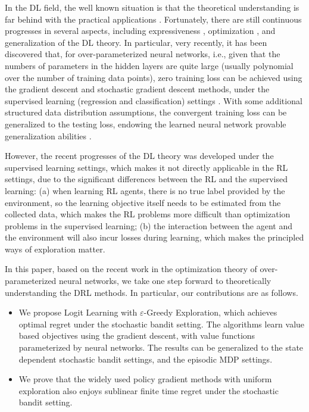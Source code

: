 In the DL field, the well known situation is that the theoretical understanding is far behind with the practical applications \citep{goodfellow2016deep,zhang2016understanding}. Fortunately, there are still continuous progresses in several aspects, including expressiveness \citep{cybenko1989approximation,raghu2017expressive}, optimization \citep{kawaguchi2016deep,li2017convergence,li2018learning,du2018gradientA,du2018gradientB,allen2018convergenceA,allen2018convergenceB}, and generalization \cite{neyshabur2017exploring,allen2018learning} of the DL theory. In particular, very recently, it has been discovered that, for over-parameterized neural networks, i.e., given that the numbers of parameters in the hidden layers are quite large (usually polynomial over the number of training data points), zero training loss can be achieved using the gradient descent and stochastic gradient descent methods, under the supervised learning (regression and classification) settings \citep{li2018learning,du2018gradientA,du2018gradientB,allen2018convergenceA,allen2018convergenceB}. With some additional structured data distribution assumptions, the convergent training loss can be generalized to the testing loss, endowing the learned neural network provable generalization abilities \citep{li2018learning,allen2018learning}.

However, the recent progresses of the DL theory was developed under the supervised learning settings, which makes it not directly applicable in the RL settings, due to the significant differences between the RL and the supervised learning: (a) when learning RL agents, there is no true label provided by the environment, so the learning objective itself needs to be estimated from the collected data, which makes the RL problems more difficult than optimization problems in the supervised learning; (b) the interaction between the  agent and the environment will also incur losses during learning, which makes the principled ways of exploration matter.

In this paper, based on the recent work in the optimization theory of over-parameterized neural networks, we take one step forward to theoretically understanding the DRL methods. In particular, our contributions are as follows.

\begin{itemize}
    \item We propose Logit Learning with $\varepsilon$-Greedy Exploration, which achieves optimal regret under the stochastic bandit setting. The algorithms learn value based objectives using the gradient descent, with value functions parameterized by neural networks. The results can be generalized to the state dependent stochastic bandit settings, and the episodic MDP settings.
    \item We prove that the widely used policy gradient methods with uniform exploration also enjoys sublinear finite time regret under the stochastic bandit setting.
\end{itemize}

